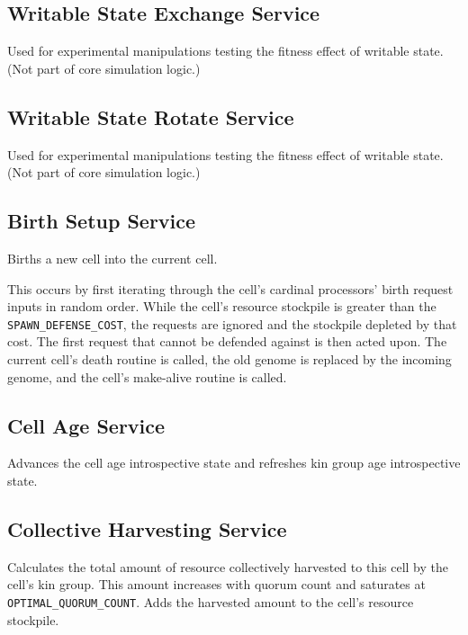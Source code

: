 \subsection{Writable State Exchange Service}


Used for experimental manipulations testing the fitness effect of writable state.
(Not part of core simulation logic.)

\subsection{Writable State Rotate Service}


Used for experimental manipulations testing the fitness effect of writable state.
(Not part of core simulation logic.)

\subsection{Birth Setup Service}


Births a new cell into the current cell.

This occurs by first iterating through the cell's cardinal processors' birth request inputs in random order.
While the cell's resource stockpile is greater than the \texttt{SPAWN\_DEFENSE\_COST}, the requests are ignored and the stockpile depleted by that cost.
The first request that cannot be defended against is then acted upon.
The current cell's death routine is called, the old genome is replaced by the incoming genome, and the cell's make-alive routine is called.

\subsection{Cell Age Service}


Advances the cell age introspective state and refreshes kin group age introspective state.

\subsection{Collective Harvesting Service}


Calculates the total amount of resource collectively harvested to this cell by the cell's kin group.
This amount increases with quorum count and saturates at \texttt{OPTIMAL\_QUORUM\_COUNT}.
Adds the harvested amount to the cell's resource stockpile.

